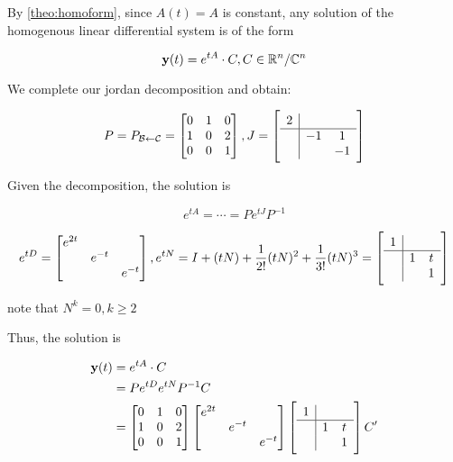 	\begin{sol}
		By \cref*{theo:homoform}, since $A(t) = A$ is constant, any solution of the homogenous linear differential system is of the form

		\[\bm{\mathrm{y}}(t) = e^{tA}\cdot C, C \in \mathbb{R}^n / \mathbb{C}^n\]

		We complete our jordan decomposition and obtain:

		\begin{equation} \label{eq:ex1.4pjp}
			P = P_{\mathcal{B} \leftarrow \mathcal{C}} = \begin{bmatrix}
				0&1&0\\1&0&2\\0&0&1
			\end{bmatrix}, J = \left[\begin{array}{c|cc}
				2&&\\\hline
				&-1&1\\
				&&-1
			\end{array}\right]
		\end{equation}

		Given the decomposition, the solution is

		\begin{equation}
			e^{tA} = \cdots = Pe^{tJ}P^{-1}
		\end{equation}

		\begin{equation} \label{eq:ex1.4etd}
			e^{tD} = \begin{bmatrix}
				e^{2t}&&\\&e^{-t}&\\&&e^{-t}
			\end{bmatrix}, e^{tN} = I + (tN) + \frac{1}{2!} (tN)^2 + \frac{1}{3!}(tN)^3 = \left[\begin{array}{c|cc}
				1&&\\\hline
				&1&t\\
				&&1
			\end{array}\right]
		\end{equation}

		note that $N^k = 0, k \geq 2$

		Thus, the solution is

		\begin{align}
			\bm{\mathrm{y}}(t) &= e^{tA} \cdot C\\
			&= Pe^{tD} e^{tN} P^{-1}C\\
			&= \begin{bmatrix}
				0&1&0\\1&0&2\\0&0&1
			\end{bmatrix} \begin{bmatrix}
				e^{2t}&&\\&e^{-t}&\\&&e^{-t}
			\end{bmatrix} \left[\begin{array}{c|cc}
				1&&\\\hline
				&1&t\\
				&&1
			\end{array}\right] C'
		\end{align}
	\end{sol}

